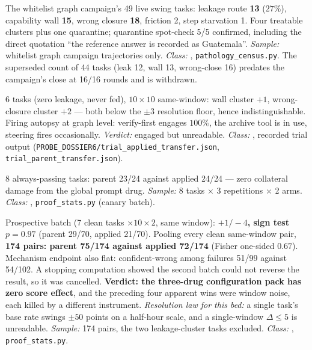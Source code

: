 \begin{description}[leftmargin=0pt,labelindent=0pt,labelsep=0pt,style=nextline,font=\normalfont,itemsep=6pt]
\item[\textbf{F31}\quad Pathology census.]
The whitelist graph campaign's 49 live swing tasks: leakage route
\textbf{13} ($27\%$), capability wall \textbf{15}, wrong closure
\textbf{18}, friction 2, step starvation 1. Four treatable clusters plus
one quarantine; quarantine spot-check 5/5 confirmed, including the direct
quotation ``the reference answer is recorded as Guatemala''.
\emph{Sample:} whitelist graph campaign trajectories only.
\emph{Class:} , \texttt{pathology\_census.py}. The superseded
count of 44 tasks (leak 12, wall 13, wrong-close 16) predates the
campaign's close at 16/16 rounds and is withdrawn.

\item[\textbf{F32}\quad Clean-cluster transfer trial.]
6 tasks (zero leakage, never fed), $10 \times 10$ same-window: wall cluster
$+1$, wrong-closure cluster $+2$ --- both below the $\pm 3$ resolution
floor, hence indistinguishable. Firing autopsy at graph level: verify-first
engages $100\%$, the archive tool is in use, steering fires occasionally.
\emph{Verdict:} engaged but unreadable. \emph{Class:} , recorded
trial output (\texttt{PROBE\_DOSSIER6/trial\_applied\_transfer.json},
\texttt{trial\_parent\_transfer.json}).

\item[\textbf{F33}\quad Canary, for harmlessness.]
8 always-passing tasks: parent 23/24 against applied 24/24 --- zero
collateral damage from the global prompt drug. \emph{Sample:} 8 tasks
$\times$ 3 repetitions $\times$ 2 arms. \emph{Class:} ,
\texttt{proof\_stats.py} (canary batch).

\item[\textbf{F34}\quad Pre-registered efficacy verdict.]
Prospective batch (7 clean tasks $\times 10 \times 2$, same window):
\textbf{$+1/-4$, sign test $p = 0.97$} (parent 29/70, applied 21/70).
Pooling every clean same-window pair, \textbf{174 pairs: parent 75/174
against applied 72/174} (Fisher one-sided $0.67$). Mechanism endpoint
also flat: confident-wrong among failures 51/99 against 54/102. A stopping
computation showed the second batch could not reverse the result, so it was
cancelled. \textbf{Verdict: the three-drug configuration pack has zero
score effect}, and the preceding four apparent wins were window noise, each
killed by a different instrument. \emph{Resolution law for this bed:} a
single task's base rate swings $\pm 50$ points on a half-hour scale, and a
single-window $\Delta \le 5$ is unreadable. \emph{Sample:} 174 pairs, the
two leakage-cluster tasks excluded. \emph{Class:} ,
\texttt{proof\_stats.py}.


\end{description}
